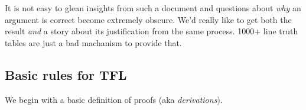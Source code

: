 
It is not easy to glean insights from such a document and questions about
\emph{why} an argument is correct become extremely obscure. We'd really like
to get both the result \emph{and} a story about its justification from the same
process. 1000+ line truth tables are just a bad machanism to provide that.

\subsection{Basic rules for TFL}

We begin with a basic definition of proofs (aka \emph{derivations}).

